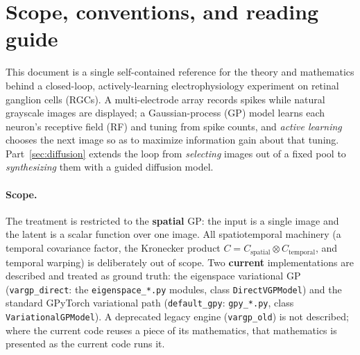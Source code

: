 \section*{Scope, conventions, and reading guide}

This document is a single self-contained reference for the theory and mathematics
behind a closed-loop, actively-learning electrophysiology experiment on retinal
ganglion cells (RGCs). A multi-electrode array records spikes while natural
grayscale images are displayed; a Gaussian-process (GP) model learns each
neuron's receptive field (RF) and tuning from spike counts, and \emph{active
learning} chooses the next image so as to maximize information gain about that
tuning. Part~\ref{sec:diffusion} extends the loop from \emph{selecting} images out
of a fixed pool to \emph{synthesizing} them with a guided diffusion model.

\paragraph{Scope.} The treatment is restricted to the \textbf{spatial} GP: the
input is a single image and the latent is a scalar function over one image. All
spatiotemporal machinery (a temporal covariance factor, the Kronecker product
$C=C_{\mathrm{spatial}}\otimes C_{\mathrm{temporal}}$, and temporal warping) is
deliberately out of scope. Two \textbf{current} implementations are described and
treated as ground truth: the eigenspace variational GP
(\texttt{vargp\_direct}: the \texttt{eigenspace\_*.py} modules, class
\texttt{DirectVGPModel}) and the standard GPyTorch variational path
(\texttt{default\_gpy}: \texttt{gpy\_*.py}, class \texttt{VariationalGPModel}). A
deprecated legacy engine (\texttt{vargp\_old}) is not described; where the current
code reuses a piece of its mathematics, that mathematics is presented as the
current code runs it.

